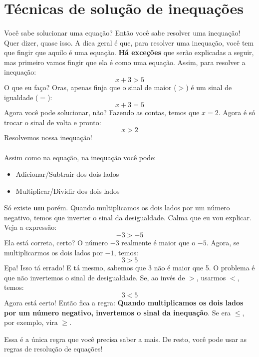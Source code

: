 \documentclass[11pt]{article}
\begin{document}
\section{Técnicas de solução de inequações}
\paragraph{}
Você sabe solucionar uma equação? Então você sabe resolver uma inequação! Quer
dizer, quase isso. A dica geral é que, para resolver uma inequação, você tem
que fingir que aquilo é uma equação. \textbf{Há exceções} que serão explicadas
a seguir, mas primeiro vamos fingir que ela é como uma equação. Assim, para
resolver a inequação:
$$x + 3 > 5$$
O que eu faço? Oras, apenas finja que o sinal de maior ($>$) é um sinal de 
igualdade ($=$):
$$x + 3 = 5$$
Agora você pode solucionar, não? Fazendo as contas, temos que $x = 2$. Agora é
só trocar o sinal de volta e pronto:
$$x > 2$$
Resolvemos nossa inequação!

\paragraph{}
Assim como na equação, na inequação você pode:
\begin{itemize}
	\item Adicionar/Subtrair dos dois lados
	\item Multiplicar/Dividir dos dois lados
\end{itemize}

Só existe \textbf{um} porém. Quando multiplicamos os dois lados por um número
negativo, temos que inverter o sinal da desigualdade. Calma que eu vou explicar.
Veja a expressão:
$$-3 > -5$$
Ela está correta, certo? O número $-3$ realmente é maior que o $-5$. Agora,
se multiplicarmos os dois lados por $-1$, temos:
$$3 > 5$$
Epa! Isso tá errado! E tá mesmo, sabemos que 3 não é maior que 5. O problema
é que não invertemos o sinal de desigualdade. Se, ao invés de $>$, usarmos
$<$, temos:
$$3 < 5$$
Agora está certo! Então fica a regra: \textbf{Quando multiplicamos os dois 
lados por um número negativo, invertemos o sinal da inequação}. Se era
$\leq$, por exemplo, vira $\geq$.

Essa é a única regra que você precisa saber a mais. De resto, você pode usar
as regras de resolução de equações!

\newpage
\end{document}
